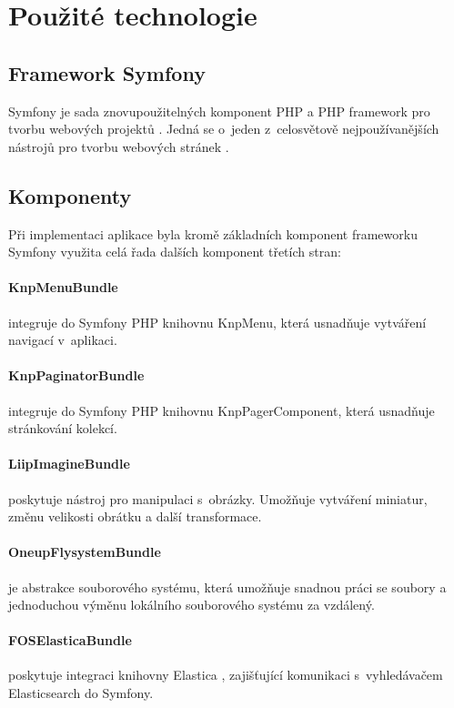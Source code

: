 \section{Použité technologie}\label{implementace-technologie}

\subsection{Framework Symfony}  
Symfony je sada znovupoužitelných komponent PHP a PHP framework pro tvorbu webových projektů \autocite{symfony}. Jedná se o~jeden z~celosvětově nejpoužívanějších nástrojů pro tvorbu webových stránek \autocite{php-frameworky}.

\subsection{Komponenty}
Při implementaci aplikace byla kromě základních komponent frameworku Symfony využita celá řada dalších komponent třetích stran:

    \paragraph{KnpMenuBundle}
    integruje do Symfony PHP knihovnu KnpMenu, která usnadňuje vytváření navigací v~aplikaci. \autocite{knpmenu} 

    \paragraph{KnpPaginatorBundle}
    integruje do Symfony PHP knihovnu KnpPagerComponent, která usnadňuje stránkování kolekcí. \autocite{knppaginator}
    
    \paragraph{LiipImagineBundle}
    poskytuje nástroj pro manipulaci s~obrázky. Umožňuje vytváření miniatur, změnu velikosti obrátku a další transformace. \autocite{liipimagine}

    \paragraph{OneupFlysystemBundle}
    je abstrakce souborového systému, která umožňuje snadnou práci se soubory a jednoduchou výměnu lokálního souborového systému za vzdálený. \autocite{oneupflysytem}
   
    \paragraph{FOSElasticaBundle}
    poskytuje integraci knihovny Elastica \autocite{elastica}, zajišťující komunikaci s~vyhledávačem Elasticsearch \autocite{elasticsearch} do Symfony. \autocite{foselastica}  
   
